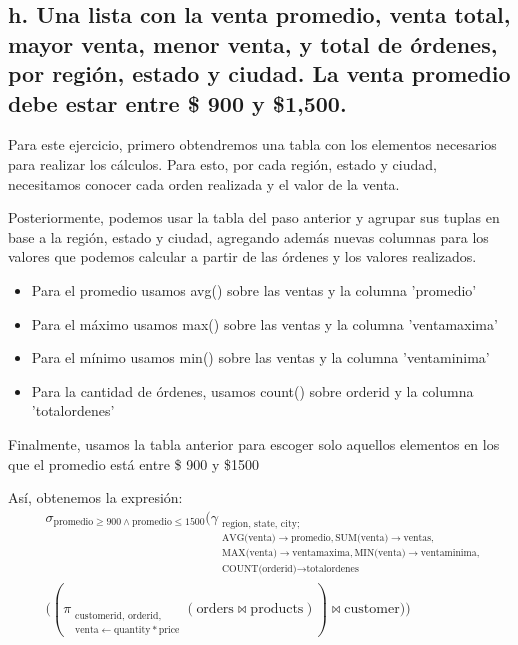 \subsection*{h. Una lista con la venta promedio, venta total, mayor venta, menor venta, y total de órdenes, por región, estado y ciudad. La venta promedio debe estar entre \$ 900 y \$1,500.}

Para este ejercicio, primero obtendremos una tabla con los elementos necesarios para realizar los cálculos. Para esto, por cada región, estado y ciudad, necesitamos conocer cada orden realizada y el valor de la venta.

Posteriormente, podemos usar la tabla del paso anterior y agrupar sus tuplas en base a la región, estado y ciudad, agregando además nuevas columnas para los valores que podemos calcular a partir de las órdenes y los valores realizados. 
\begin{itemize}
    \item Para el promedio usamos avg() sobre las ventas y la columna 'promedio'
    \item Para el máximo usamos max() sobre las ventas y la columna 'ventamaxima'
    \item Para el mínimo usamos min() sobre las ventas y la columna 'ventaminima' 
    \item Para la cantidad de órdenes, usamos count() sobre orderid y la columna 'totalordenes'
\end{itemize}

Finalmente, usamos la tabla anterior para escoger solo aquellos elementos en los que el promedio está entre \$ 900 y \$1500

Así, obtenemos la expresión:
\begin{equation}
\begin{split}
&\sigma_{\text{promedio} \geq 900 \land \text{promedio} \leq 1500} \Biggl( \gamma_{\substack{\text{region, state, city}; \\ \text{AVG(venta)} \to \text{promedio}, \text{SUM(venta)} \to \text{ventas}, \\ \text{MAX(venta)} \to \text{ventamaxima}, \text{MIN(venta)} \to \text{ventaminima}, \\ \text{COUNT(orderid)} \to \text{totalordenes}}} \\
&\Biggl( \left( \pi_{\substack{\text{customerid, orderid,} \\ \text{venta} \leftarrow \text{quantity} * \text{price}}} ( \text{orders} \bowtie \text{products} ) \right) \bowtie \text{customer} \Biggr) \Biggr) 
\end{split}
\end{equation}

